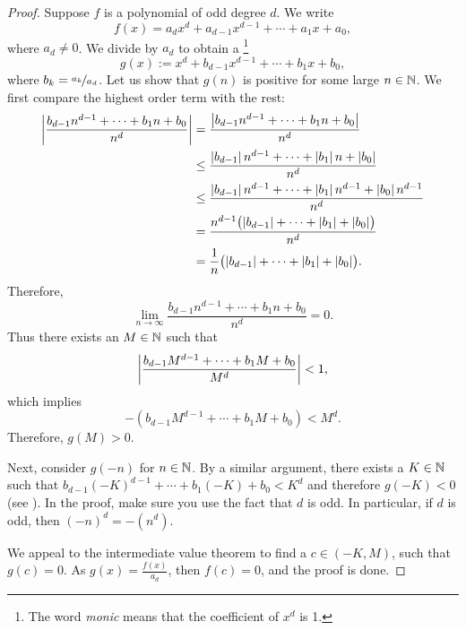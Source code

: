 \begin{proof}
Suppose $f$ is a polynomial of odd degree $d$.  We write
\begin{equation*}
f(x) = a_d x^d + a_{d-1} x^{d-1} + \cdots + a_1 x + a_0 ,
\end{equation*}
where $a_d \not= 0$.  We divide by $a_d$ to obtain a 
\emph{}\footnote{The word \emph{monic} means that
the coefficient of $x^d$ is 1.}
\begin{equation*}
g(x) := x^d + b_{d-1} x^{d-1} + \cdots + b_1 x + b_0 ,
\end{equation*}
where $b_k = \nicefrac{a_k}{a_d}$.
Let us show that $g(n)$ is
positive for some large $n \in {\mathbb{N}}$.
We first compare the highest order term with the rest:
\begin{equation*}
\begin{split}
\left\lvert {\frac{b_{d-1} n^{d-1} + \cdots + b_1 n + b_0}{n^d}} \right\rvert
& =
\frac{\left\lvert {b_{d-1} n^{d-1} + \cdots + b_1 n + b_0} \right\rvert}{n^d}
\\
& \leq
\frac{\left\lvert {b_{d-1}} \right\rvert n^{d-1} + \cdots + \left\lvert {b_1} \right\rvert n + \left\lvert {b_0} \right\rvert}{n^d}
\\
& \leq
\frac{\left\lvert {b_{d-1}} \right\rvert n^{d-1} + \cdots + \left\lvert {b_1} \right\rvert n^{d-1} + \left\lvert {b_0} \right\rvert n^{d-1}}{n^d}
\\
& =
\frac{n^{d-1}\bigl(\left\lvert {b_{d-1}} \right\rvert + \cdots + \left\lvert {b_1} \right\rvert + \left\lvert {b_0} \right\rvert\bigr)}{n^d}
\\
& =
\frac{1}{n}
\bigl(\left\lvert {b_{d-1}} \right\rvert + \cdots + \left\lvert {b_1} \right\rvert + \left\lvert {b_0} \right\rvert\bigr) .
\end{split}
\end{equation*}
Therefore,
\begin{equation*}
\lim_{n\to\infty} \frac{b_{d-1} n^{d-1} + \cdots + b_1 n + b_0}{n^d}
= 0 .
\end{equation*}
Thus there exists an $M \in {\mathbb{N}}$ such that 
\begin{equation*}
\left\lvert {\frac{b_{d-1} M^{d-1} + \cdots + b_1 M + b_0}{M^d}} \right\rvert < 1 ,
\end{equation*}
which implies
\begin{equation*}
-(b_{d-1} M^{d-1} + \cdots + b_1 M + b_0) < M^d .
\end{equation*}
Therefore, $g(M) > 0$.

Next, consider $g(-n)$ for $n \in {\mathbb{N}}$.  By a similar argument,
there exists a $K \in {\mathbb{N}}$ such that
$b_{d-1} {(-K)}^{d-1} + \cdots + b_1 (-K) + b_0 < K^d$
and therefore $g(-K) < 0$ (see ).
In the proof,
 make sure you use the fact that $d$ is odd.
In particular, if $d$ is odd, then ${(-n)}^d = -(n^d)$.

We appeal to the intermediate value theorem to find a
$c \in (-K,M)$, such that $g(c) = 0$.  As $g(x) = \frac{f(x)}{a_d}$,
then $f(c) = 0$, and the proof is done.
\end{proof}


